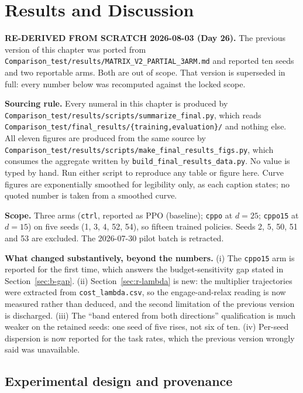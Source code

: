 \chapter{Results and Discussion}\label{ch:results}

\begin{draftnote}
\textbf{RE-DERIVED FROM SCRATCH 2026-08-03 (Day 26).} The previous version of this chapter was
ported from \texttt{Comparison\_test/results/MATRIX\_V2\_PARTIAL\_3ARM.md} and reported ten seeds
and two reportable arms. Both are out of scope. That version is superseded in full: every number
below was recomputed against the locked scope.

\textbf{Sourcing rule.} Every numeral in this chapter is produced by
\texttt{Comparison\_test/results/scripts/summarize\_final.py}, which reads
\texttt{Comparison\_test/final\_results/\{training,evaluation\}/} and nothing else. All eleven
figures are produced from the same source by
\texttt{Comparison\_test/results/scripts/make\_final\_results\_figs.py}, which consumes the
aggregate written by \texttt{build\_final\_results\_data.py}. No value is typed by hand. Run
either script to reproduce any table or figure here. Curve figures are exponentially smoothed for
legibility only, as each caption states; no quoted number is taken from a smoothed curve.

\textbf{Scope.} Three arms (\texttt{ctrl}, reported as PPO (baseline); \texttt{cppo} at
\(d=25\); \texttt{cppo15} at \(d=15\)) on five seeds (1, 3, 4, 52, 54), so fifteen trained
policies. Seeds 2, 5, 50, 51 and 53 are excluded. The 2026-07-30 pilot batch is retracted.

\textbf{What changed substantively, beyond the numbers.} (i) The \texttt{cppo15} arm is
reported for the first time, which answers the budget-sensitivity gap stated in
Section~\ref{sec:b-gap}. (ii) Section~\ref{sec:r-lambda} is new: the multiplier trajectories were
extracted from \texttt{cost\_lambda.csv}, so the engage-and-relax reading is now measured rather
than deduced, and the second limitation of the previous version is discharged. (iii) The
``band entered from both directions'' qualification is much weaker on the retained seeds: one
seed of five rises, not six of ten. (iv) Per-seed dispersion is now reported for the task rates,
which the previous version wrongly said was unavailable.
\end{draftnote}

\section{Experimental design and provenance}\label{sec:r-design}

